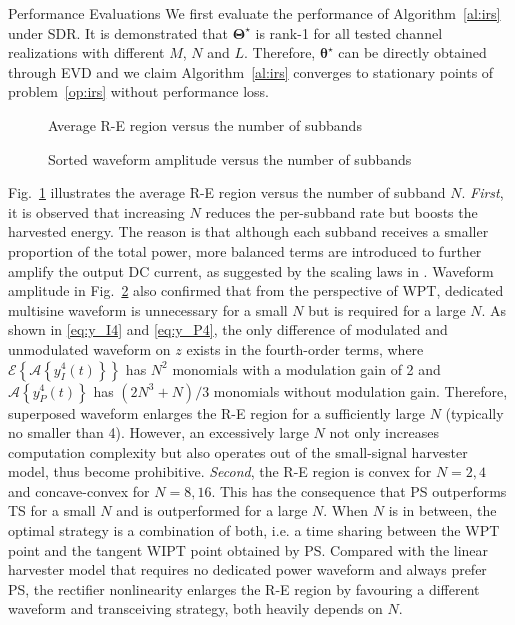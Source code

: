 \documentclass[journal]{IEEEtran}
\begin{document}
\begin{section}{Performance Evaluations}
		We first evaluate the performance of Algorithm~\ref{al:irs} under SDR. It is demonstrated that $\boldsymbol{\Theta}^{\star}$ is rank-\num{1} for all tested channel realizations with different $M$, $N$ and $L$. Therefore, $\boldsymbol{\theta}^{\star}$ can be directly obtained through EVD and we claim Algorithm~\ref{al:irs} converges to stationary points of problem~\ref{op:irs} without performance loss.

		\begin{figure}[!t]
			\centering
			\begin{adjustbox}{width=\linewidth}
				
			\end{adjustbox}
			\caption{Average R-E region versus the number of subbands}
			\label{fi:re_subband}
		\end{figure}

		\begin{figure}[!t]
			\centering
			\begin{adjustbox}{width=\linewidth}
				
			\end{adjustbox}
			\caption{Sorted waveform amplitude versus the number of subbands}
			\label{fi:waveform_subband}
		\end{figure}

		Fig.~\ref{fi:re_subband} illustrates the average R-E region versus the number of subband $N$. \textit{First}, it is observed that increasing $N$ reduces the per-subband rate but boosts the harvested energy. The reason is that although each subband receives a smaller proportion of the total power, more balanced terms are introduced to further amplify the output DC current, as suggested by the scaling laws in \cite{Clerckx2018b}. Waveform amplitude in Fig.~\ref{fi:waveform_subband} also confirmed that from the perspective of WPT, dedicated multisine waveform is unnecessary for a small $N$ but is required for a large $N$. As shown in \ref{eq:y_I4} and \ref{eq:y_P4}, the only difference of modulated and unmodulated waveform on $z$ exists in the fourth-order terms, where $\mathcal{E}\left\{\mathcal{A}\left\{y_{I}^4(t)\right\}\right\}$ has $N^2$ monomials with a modulation gain of \num{2} and $\mathcal{A}\left\{y_{P}^4(t)\right\}$ has $(2N^3+N)/3$ monomials without modulation gain. Therefore, superposed waveform enlarges the R-E region for a sufficiently large $N$ (typically no smaller than 4). However, an excessively large $N$ not only increases computation complexity but also operates out of the small-signal harvester model, thus become prohibitive. \textit{Second}, the R-E region is convex for $N = 2, 4$ and concave-convex for $N = 8, 16$. This has the consequence that PS outperforms TS for a small $N$ and is outperformed for a large $N$. When $N$ is in between, the optimal strategy is a combination of both, i.e. a time sharing between the WPT point and the tangent WIPT point obtained by PS. Compared with the linear harvester model that requires no dedicated power waveform and always prefer PS, the rectifier nonlinearity enlarges the R-E region by favouring a different waveform and transceiving strategy, both heavily depends on $N$.


\end{section}
\end{document}
